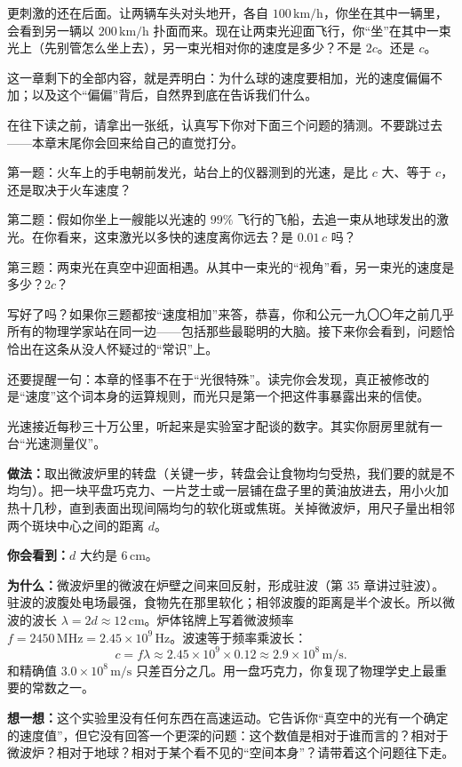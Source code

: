更刺激的还在后面。让两辆车头对头地开，各自 \(100\,\mathrm{km/h}\)，你坐在其中一辆里，会看到另一辆以 \(200\,\mathrm{km/h}\) 扑面而来。现在让两束光迎面飞行，你“坐”在其中一束光上（先别管怎么坐上去），另一束光相对你的速度是多少？不是 \(2c\)。还是 \(c\)。

这一章剩下的全部内容，就是弄明白：为什么球的速度要相加，光的速度偏偏不加；以及这个“偏偏”背后，自然界到底在告诉我们什么。


在往下读之前，请拿出一张纸，认真写下你对下面三个问题的猜测。不要跳过去——本章末尾你会回来给自己的直觉打分。

第一题：火车上的手电朝前发光，站台上的仪器测到的光速，是比 \(c\) 大、等于 \(c\)，还是取决于火车速度？

第二题：假如你坐上一艘能以光速的 \(99\%\) 飞行的飞船，去追一束从地球发出的激光。在你看来，这束激光以多快的速度离你远去？是 \(0.01\,c\) 吗？

第三题：两束光在真空中迎面相遇。从其中一束光的“视角”看，另一束光的速度是多少？\(2c\)？

写好了吗？如果你三题都按“速度相加”来答，恭喜，你和公元一九〇〇年之前几乎所有的物理学家站在同一边——包括那些最聪明的大脑。接下来你会看到，问题恰恰出在这条从没人怀疑过的“常识”上。

还要提醒一句：本章的怪事不在于“光很特殊”。读完你会发现，真正被修改的是“速度”这个词本身的运算规则，而光只是第一个把这件事暴露出来的信使。


\begin{experiment}[用微波炉和一盘巧克力称出光速]
光速接近每秒三十万公里，听起来是实验室才配谈的数字。其实你厨房里就有一台“光速测量仪”。

\textbf{做法：}取出微波炉里的转盘（关键一步，转盘会让食物均匀受热，我们要的就是不均匀）。把一块平盘巧克力、一片芝士或一层铺在盘子里的黄油放进去，用小火加热十几秒，直到表面出现间隔均匀的软化斑或焦斑。关掉微波炉，用尺子量出相邻两个斑块中心之间的距离 \(d\)。

\textbf{你会看到：}\(d\) 大约是 \(6\,\mathrm{cm}\)。

\textbf{为什么：}微波炉里的微波在炉壁之间来回反射，形成驻波（第 35 章讲过驻波）。驻波的波腹处电场最强，食物先在那里软化；相邻波腹的距离是半个波长。所以微波的波长 \(\lambda=2d\approx 12\,\mathrm{cm}\)。炉体铭牌上写着微波频率 \(f=2450\,\mathrm{MHz}=2.45\times10^{9}\,\mathrm{Hz}\)。波速等于频率乘波长：
\[
c=f\lambda\approx 2.45\times10^{9}\times 0.12\approx 2.9\times10^{8}\,\mathrm{m/s}.
\]
和精确值 \(3.0\times10^{8}\,\mathrm{m/s}\) 只差百分之几。用一盘巧克力，你复现了物理学史上最重要的常数之一。

\textbf{想一想：}这个实验里没有任何东西在高速运动。它告诉你“真空中的光有一个确定的速度值”，但它没有回答一个更深的问题：这个数值是相对于谁而言的？相对于微波炉？相对于地球？相对于某个看不见的“空间本身”？请带着这个问题往下走。
\end{experiment}

